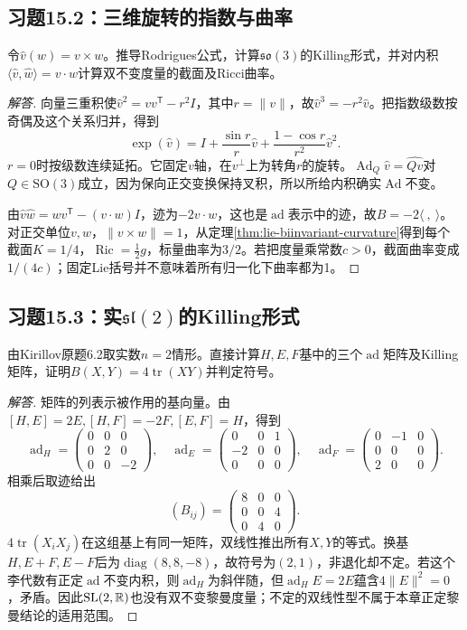 \subsection*{习题15.2：三维旋转的指数与曲率}
令$\widehat v(w)=v\times w$。推导Rodrigues公式，计算$\mathfrak{so}(3)$的Killing形式，并对内积$\langle\widehat v,\widehat w\rangle=v\cdot w$计算双不变度量的截面及Ricci曲率。
\begin{proof}[解答]
向量三重积使$\widehat v^2=vv^{\mathsf T}-r^2I$，其中$r=\|v\|$，故$\widehat v^3=-r^2\widehat v$。把指数级数按奇偶及这个关系归并，得到
\[
 \exp(\widehat v)=I+\frac{\sin r}{r}\widehat v+
 \frac{1-\cos r}{r^2}\widehat v^2.
\]
$r=0$时按级数连续延拓。它固定$v$轴，在$v^\perp$上为转角$r$的旋转。$\operatorname{Ad}_Q\widehat v=\widehat{Qv}$对$Q\in\mathrm{SO}(3)$成立，因为保向正交变换保持叉积，所以所给内积确实$\operatorname{Ad}$不变。

由$\widehat v\widehat w=wv^{\mathsf T}-(v\cdot w)I$，迹为$-2v\cdot w$，这也是$\operatorname{ad}$表示中的迹，故$B=-2\langle\ ,\ \rangle$。对正交单位$v,w$，$\|v\times w\|=1$，从定理\ref{thm:lie-biinvariant-curvature}得到每个截面$K=1/4$，$\operatorname{Ric}=\frac12g$，标量曲率为$3/2$。若把度量乘常数$c>0$，截面曲率变成$1/(4c)$；固定Lie括号并不意味着所有归一化下曲率都为1。
\end{proof}

\subsection*{习题15.3：实$\mathfrak{sl}(2)$的Killing形式}
由Kirillov原题6.2取实数$n=2$情形。直接计算$H,E,F$基中的三个$\operatorname{ad}$矩阵及Killing矩阵，证明$B(X,Y)=4\operatorname{tr}(XY)$并判定符号。
\begin{proof}[解答]
矩阵的列表示被作用的基向量。由$[H,E]=2E,[H,F]=-2F,[E,F]=H$，得到
\[
 \operatorname{ad}_H=\begin{pmatrix}0&0&0\\0&2&0\\0&0&-2\end{pmatrix},\quad
 \operatorname{ad}_E=\begin{pmatrix}0&0&1\\-2&0&0\\0&0&0\end{pmatrix},\quad
 \operatorname{ad}_F=\begin{pmatrix}0&-1&0\\0&0&0\\2&0&0\end{pmatrix}.
\]
相乘后取迹给出
\[
 (B_{ij})=\begin{pmatrix}8&0&0\\0&0&4\\0&4&0\end{pmatrix}.
\]
$4\operatorname{tr}(X_iX_j)$在这组基上有同一矩阵，双线性推出所有$X,Y$的等式。换基$H,E+F,E-F$后为$\operatorname{diag}(8,8,-8)$，故符号为$(2,1)$，非退化却不定。若这个李代数有正定$\operatorname{ad}$不变内积，则$\operatorname{ad}_H$为斜伴随，但$\operatorname{ad}_HE=2E$蕴含$4\|E\|^2=0$，矛盾。因此$\mathrm{SL}(2,\mathbb{R})$也没有双不变黎曼度量；不定的双线性型不属于本章正定黎曼结论的适用范围。
\end{proof}

